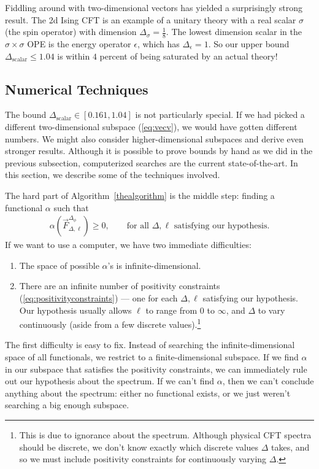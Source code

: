 \documentclass[11pt]{ws-rv9x6}
\newcommand\be{\begin{eqnarray}}
\newcommand\ee{\end{eqnarray}}
\newcommand\f\phi
\newcommand\e\epsilon
\newcommand\<\langle
\renewcommand\>\rangle
\renewcommand\.{\cdot}
\newcommand\x\times
\newcommand\s\sigma
\newcommand\De{\Delta}
\newcommand\oo\infty
\begin{document}
Fiddling around with two-dimensional vectors has yielded a surprisingly strong result.  The 2d Ising CFT is an example of a unitary theory with a real scalar $\s$ (the spin operator) with dimension $\De_\s=\frac 1 8$.  The lowest dimension scalar in the $\s\x\s$ OPE is the energy operator $\e$, which has $\De_\e=1$.  So our upper bound $\De_\mathrm{scalar}\leq 1.04$ is within $4$ percent of being saturated by an actual theory!

\subsection{Numerical Techniques}
\label{sec:numericaltechniques}

The bound $\De_\mathrm{scalar}\in[0.161,1.04]$ is not particularly special.  If we had picked a different two-dimensional subspace (\ref{eq:vecv}), we would have gotten different numbers.  We might also consider higher-dimensional subspaces and derive even stronger results.  Although it is possible to prove bounds by hand as we did in the previous subsection, computerized searches are the current state-of-the-art.  In this section, we describe some of the techniques involved.

The hard part of Algorithm~\ref{thealgorithm} is the middle step: finding a functional $\alpha$ such that
\be
\label{eq:positivityconstraints}
\alpha(\vec F_{\De,\ell}^{\De_\f}) \geq 0,\qquad\textrm{for all $\De,\ell$ satisfying our hypothesis}.
\ee
If we want to use a computer, we have two immediate difficulties:
\begin{enumerate}
\item The space of possible $\alpha$'s is infinite-dimensional.
\item There are an infinite number of positivity constraints (\ref{eq:positivityconstraints}) --- one for each $\De,\ell$ satisfying our hypothesis.  Our hypothesis usually allows $\ell$ to range from $0$ to $\oo$, and $\De$ to vary continuously (aside from a few discrete values).\footnote{This is due to ignorance about the spectrum. Although physical CFT spectra should be discrete, we don't know exactly which discrete values $\De$ takes, and so we must include positivity constraints for continuously varying $\De$.}
\end{enumerate}

The first difficulty is easy to fix.  Instead of searching the infinite-dimensional space of all functionals, we restrict to a finite-dimensional subspace.  If we find $\alpha$ in our subspace that satisfies the positivity constraints, we can immediately rule out our hypothesis about the spectrum.  If we can't find $\alpha$, then we can't conclude anything about the spectrum: either no functional exists, or we just weren't searching a big enough subspace.
\end{document}
